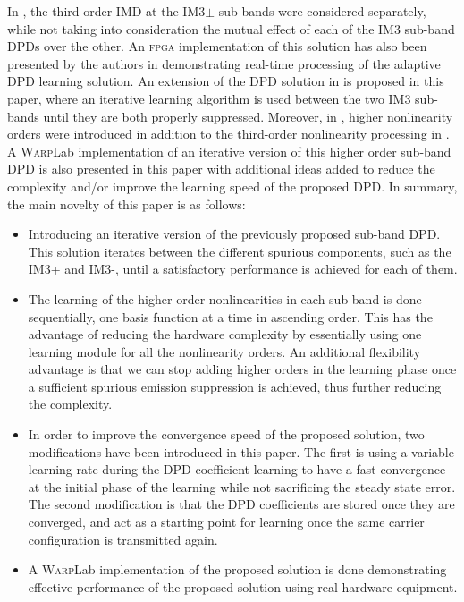 \documentclass[9pt,conference]{IEEEtran}
\begin{document}
\begin{spacing}{0.88}
In \cite{ICASSP2014}, the third-order IMD at the IM3$\pm$ sub-bands were considered separately, while not taking into consideration the mutual effect of each of the IM3 sub-band DPDs over the other. An \textsc{fpga} implementation of this solution has also been presented by the authors in \cite{Asilomar2015} demonstrating real-time processing of the adaptive DPD learning solution.
An extension of the DPD solution in \cite{ICASSP2014,Asilomar2015} is proposed in this paper, where an iterative learning algorithm is used between the two IM3 sub-bands until they are both properly suppressed. 
Moreover, in \cite{TMTT_SubbandDPD}, higher nonlinearity orders were introduced in addition to the third-order nonlinearity processing in \cite{ICASSP2014,Asilomar2015}.
A \textsc{Warp}Lab implementation of an iterative version of this higher order sub-band DPD is also presented in this paper with additional ideas added to reduce the complexity and/or improve the learning speed of the proposed DPD. In summary, the main novelty of this paper is as follows:
\begin{itemize}
  \item Introducing an iterative version of the previously proposed sub-band DPD. This solution iterates between the different spurious components, such as the IM3+ and IM3-, until a satisfactory performance is achieved for each of them.
  \item The learning of the higher order nonlinearities in each sub-band is done sequentially, one basis function at a time in ascending order. This has the advantage of reducing the hardware complexity by essentially using one learning module for all the nonlinearity orders. An additional flexibility advantage is that we can stop adding higher orders in the learning phase once a sufficient spurious emission suppression is achieved, thus further reducing the complexity.
	\item In order to improve the convergence speed of the proposed solution, two modifications have been introduced in this paper. The first is using a variable learning rate during the DPD coefficient learning to have a fast convergence at the initial phase of the learning while not sacrificing the steady state error. The second modification is that the DPD coefficients are stored once they are converged, and act as a starting point for learning once the same carrier configuration is transmitted again.
	\item A \textsc{Warp}Lab implementation of the proposed solution is done demonstrating effective performance of the proposed solution using real hardware equipment. 
\end{itemize}


\end{spacing}
\end{document}
